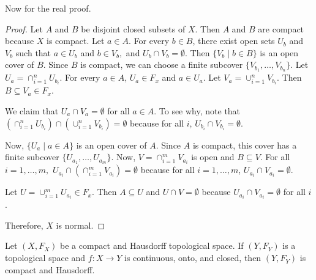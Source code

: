 Now for the real proof. 
\begin{proof}
	Let $A$ and $B$ be disjoint closed subsets of $X$. Then $A$ and $B$ are compact because $X$ is compact. Let $a \in A$. For every $b \in B$, there exist open sets $U_b$ and $V_b$ such that $a \in U_b$ and $b \in V_b,$ and $U_b \cap V_b = \emptyset.$ Then $\{V_b \mid b \in B\}$ is an open cover of $B$. Since $B$ is compact, we can choose a finite subcover $\{V_{b_1},\ldots,V_{b_n}\}.$ Let $U_a=\cap_{i=1}^n U_{b_i}$. For every $a \in A$, $U_a \in F_x$ and $a \in U_a.$ Let $V_a=\cup_{i=1}^n V_{b_i}$. Then $B \subseteq V_a \in F_x$. 
	
	We claim that $U_a \cap V_a = \emptyset$ for all $a \in A$. To see why, note that $\left( \cap_{i=1}^n U_{b_i}\right) \cap \left( \cup_{i=1}^n V_{b_i} \right) = \emptyset$ because for all $i$, $U_{b_i} \cap V_{b_i}=\emptyset.$
	
	Now, $\{U_a \mid a \in A\}$ is an open cover of $A$. Since $A$ is compact, this cover has a finite subcover $\{U_{a_1},\ldots,U_{a_m}\}$. Now, $V=\cap_{i=1}^{m}V_{a_i}$ is open and $B \subseteq V$. For all $i=1,\ldots,m,$ $U_{a_i}\cap \left( \cap_{i=1}^m V_{a_i} \right) = \emptyset$ because for all $i=1,\ldots,m$, $U_{a_i} \cap V_{a_i}=\emptyset$. 
	
	Let $U=\cup_{i=1}^m U_{a_i} \in F_x$. Then $A \subseteq U$ and $U \cap V = \emptyset$ because $U_{a_i} \cap V_{a_i}=\emptyset$ for all $i$.
	
	Therefore, $X$ is normal. 
\end{proof}
\begin{theorem}
	Let $(X,F_X)$ be a compact and Hausdorff topological space. If $(Y,F_Y)$ is a topological space and $f : X \to Y$ is continuous, onto, and closed, then $(Y,F_Y)$ is compact and Hausdorff. 
\end{theorem}
